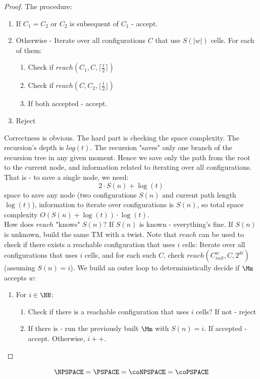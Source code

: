 \begin{proof}
The procedure:
\begin{enumerate}
	\item If $C_1 = C_2$ or $C_2$ is subsequent of $C_1$ - accept.
	\item Otherwise - Iterate over all configurations $C$ that use $S(|w|)$ cells. For each of them:
	\begin{enumerate}[2.1]
		\item Check if $reach(C_1, C, \lceil\frac{t}{2}\rceil)$
		\item Check if $reach(C, C_2, \lfloor\frac{t}{2}\rfloor)$
		\item If both accepted - accept.
	\end{enumerate}
\item Reject
\end{enumerate}
Correctness is obvious. The hard part is checking the space complexity. The recursion's depth is $log(t)$. The recursion "saves" only one branch of the recursion tree in any given moment. Hence we save only the path from the root to the current node, and information related to iterating over all configurations. That is - to save a single node, we need:
\[2\cdot S(n) + \log(t)\]
space to save any node (two configurations $S(n)$ and current path length $\log(t)$), information to iterate over configurations is $S(n)$, so total space complexity $O(S(n) + \log(t))\cdot \log(t)$.\\
How does $reach$ "knows" $S(n)$? If $S(n)$ is known - everything's fine. If $S(n)$ is unknown, build the same TM with a twist. Note that $reach$ can be used to check if there exists a reachable configuration that uses $i$ cells: Iterate over all configurations that uses $i$ cells, and for each such $C$, check $reach(C_{init}^w, C, 2^{di})$ (assuming $S(n) = i$). We build an outer loop to deterministically decide if $\Mm$ accepts $w$:
\begin{enumerate}
	\item For $i\in \NN$:
	\begin{enumerate}
		\item Check if there is a reachable configuration that uses $i$ cells? If not - reject
		\item If there is - run the previously built $\Mm$ with $S(n) = i$. If accepted - accept. Otherwise, $i++$.
	\end{enumerate}
\end{enumerate}
\end{proof}

\begin{cor}
	$$\NPSPACE = \PSPACE = \coNPSPACE = \coPSPACE$$
\end{cor}

